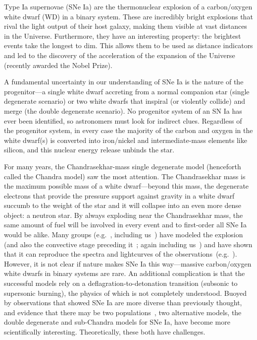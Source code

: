Type Ia supernovae (SNe Ia) are the thermonuclear explosion of a  
carbon/oxygen white dwarf (WD) in a binary system.  These are incredibly
bright explosions that rival the light output of their host galaxy,
making them visible at vast distances in the Universe.  Furthermore,
they have an interesting property: the brightest events take the
longest to dim.  This allows them to be used as distance indicators
and led to the discovery of the acceleration of the expansion of the
Universe~\cite{Per99,Rie98} (recently awarded the Nobel Prize).

A fundamental uncertainty in our understanding of SNe Ia is the nature
of the progenitor---a single white dwarf accreting from a normal
companion star (single degenerate scenario) or two white dwarfs that
inspiral (or violently collide) and merge (the double degenerate
scenario).  No progenitor system of an SN Ia has ever been
identified, so astronomers must look for indirect clues.  Regardless
of the progenitor system, in every case the majority of the carbon and
oxygen in the white dwarf(s) is converted into iron/nickel and
intermediate-mass elements like silicon, and this nuclear energy
release unbinds the star.

For many years, the Chandrasekhar-mass single degenerate model
(henceforth called the Chandra model) saw the most attention.  The
Chandrasekhar mass is the maximum possible mass of a white
dwarf---beyond this mass, the degenerate electrons that provide the
pressure support against gravity in a white dwarf succumb to the
weight of the star and it will collapse into an even more dense
object: a neutron star.  By always exploding near the Chandrasekhar
mass, the same amount of fuel will be involved in every event and to
first-order all SNe Ia would be alike.  Many groups
(e.g.~\cite{gamezo:2005,Roe07,Jor08}, including us~\cite{Kru12,Ma13})
have modeled the explosion (and also the convective stage
preceding it~\cite{hoflichstein:2002}; again including us~\cite{Non12}) and have shown that it can reproduce the
spectra and lightcurves of the observations~(e.g.~\cite{Blo11}).
However, it is not clear if nature makes SNe Ia this way---massive
carbon/oxygen white dwarfs in binary systems are rare.  An additional
complication is that the successful models rely on a
deflagration-to-detonation transition (subsonic to supersonic
burning), the physics of which is not completely understood.  Buoyed by
observations that showed SNe Ia are more diverse than previously
thought, and evidence that there may be two
populations~\cite{MannucciEtAl06,howelletal+09,How11}, two
alternative models, the double
degenerate and sub-Chandra models for SNe Ia, have become more
scientifically interesting.  Theoretically, these both have
challenges.

